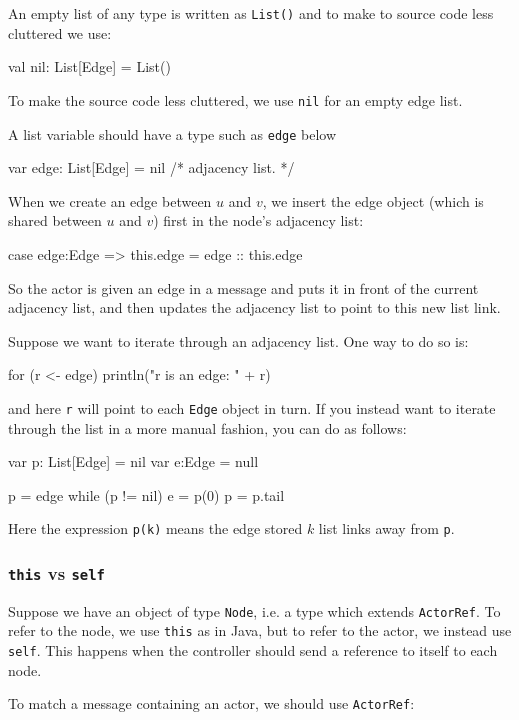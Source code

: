\documentclass{forsete}
\begin{document}
{An empty list of any type is written as \verb.List(). and to make to source
code less cluttered we use:
\begin{ccode}
val	nil: List[Edge] = List()
\end{ccode}
To make the source code less cluttered, we use \verb.nil. for an empty edge list.

A list variable should have a type such as \verb.edge. below
\begin{ccode}
var	edge: List[Edge] = nil		/* adjacency list. */
\end{ccode}

When we create an edge between $u$ and $v$, we insert the edge object (which is shared between $u$ and $v$)
first in the node's adjacency list:
\begin{ccode}
case edge:Edge => { this.edge = edge :: this.edge }
\end{ccode}

So the actor is given an edge in a message and puts it in front of the current adjacency list, and
then updates the adjacency list to point to this new list link.

Suppose we want to iterate through an adjacency list. One way to do so is:
\begin{ccode}
for (r <- edge)
	println("r is an edge: " + r)
\end{ccode}
and here \verb.r. will point to each \verb.Edge. object in turn.
If you instead want to iterate through the list in a more manual fashion, you can do as follows:
\begin{ccode}
var	p: List[Edge]	= nil
var	e:Edge		= null

p = edge
while (p != nil) {
	e = p(0)
	p = p.tail
}
\end{ccode}

Here the expression \verb.p(k). means the edge stored $k$ list links away from \verb.p..

\subsubsection*{{\tt this} vs {\tt self}}

Suppose we have an object of type \verb.Node., i.e. a type which extends \verb.ActorRef..
To refer to the node, we use {\tt this} as in Java, but to refer to the actor, 
we instead use {\tt self}. This happens when the controller should send a reference to itself to
each node.

To match a message containing an actor, we should use \verb.ActorRef.:

}
\end{document}
